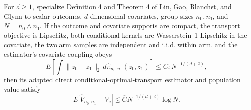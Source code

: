 For \(d\ge1\), specialize Definition 4 and Theorem 4 of Lin, Gao, Blanchet, and Glynn to scalar outcomes, \(d\)-dimensional covariates, group sizes \(n_0,n_1\), and \(N=n_0\wedge n_1\).  If the outcome and covariate supports are compact, the transport objective is Lipschitz, both conditional kernels are Wasserstein--1 Lipschitz in the covariate, the two arm samples are independent and i.i.d. within arm, and the estimator's covariate coupling obeys
\[
E\!\left[\int\|z_0-z_1\|_2\,d\widehat\pi_{n_0,n_1}(z_0,z_1)\right]\le C_{\widehat\pi}N^{-1/(d+2)},
\]
then its adapted direct conditional-optimal-transport estimator and population value satisfy
\[
E|\widehat V_{n_0,n_1}-V_{\mathrm c}|\le \overline C N^{-1/(d+2)}\log N.
\]